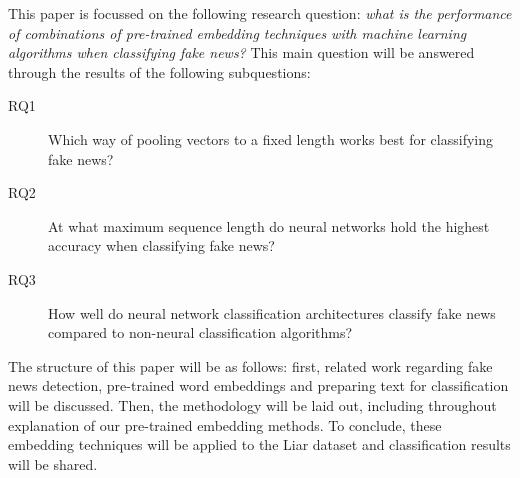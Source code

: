 This paper is focussed on the following research question: \textit{what is the performance of combinations of pre-trained embedding techniques with machine learning algorithms when classifying fake news?}
This main question will be answered through the results of the following subquestions:

\begin{description}
\item[RQ1] Which way of pooling vectors to a fixed length works best for classifying fake news?
\item[RQ2] At what maximum sequence length do neural networks hold the highest accuracy when classifying fake news?
\item[RQ3] How well do neural network classification architectures classify fake news compared to non-neural classification algorithms?
\end{description}

The structure of this paper will be as follows: first, related work regarding fake news detection, pre-trained word embeddings and preparing text for classification will be discussed.
Then, the methodology will be laid out, including throughout explanation of our pre-trained embedding methods. 
To conclude, these embedding techniques will be applied to the Liar dataset and classification results will be shared.